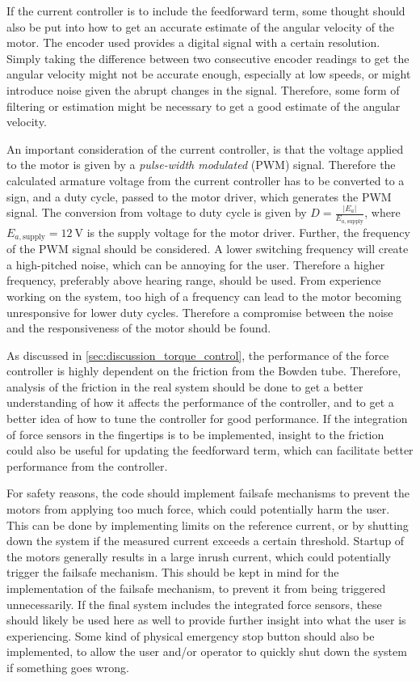 If the current controller is to include the feedforward term, some thought should also be put into how to get an accurate estimate of the angular velocity of the motor. The encoder used provides a digital signal with a certain resolution. Simply taking the difference between two consecutive encoder readings to get the angular velocity might not be accurate enough, especially at low speeds, or might introduce noise given the abrupt changes in the signal. Therefore, some form of filtering or estimation might be necessary to get a good estimate of the angular velocity.

An important consideration of the current controller, is that the voltage applied to the motor is given by a \textit{pulse-width modulated} (PWM) signal. Therefore the calculated armature voltage from the current controller has to be converted to a sign, and a duty cycle, passed to the motor driver, which generates the PWM signal. The conversion from voltage to duty cycle is given by $D = \frac{|E_a|}{E_{a, \text{supply}}}$, where $E_{a, \text{supply}}= \SI{12}{\volt}$ is the supply voltage for the motor driver. Further, the frequency of the PWM signal should be considered. A lower switching frequency will create a high-pitched noise, which can be annoying for the user. Therefore a higher frequency, preferably above hearing range, should be used. From experience working on the system, too high of a frequency can lead to the motor becoming unresponsive for lower duty cycles. Therefore a compromise between the noise and the responsiveness of the motor should be found.

As discussed in \cref{sec:discussion_torque_control}, the performance of the force controller is highly dependent on the friction from the Bowden tube. Therefore, analysis of the friction in the real system should be done to get a better understanding of how it affects the performance of the controller, and to get a better idea of how to tune the controller for good performance. If the integration of force sensors in the fingertips is to be implemented, insight to the friction could also be useful for updating the feedforward term, which can facilitate better performance from the controller.

For safety reasons, the code should implement failsafe mechanisms to prevent the motors from applying too much force, which could potentially harm the user. This can be done by implementing limits on the reference current, or by shutting down the system if the measured current exceeds a certain threshold. Startup of the motors generally results in a large inrush current, which could potentially trigger the failsafe mechanism. This should be kept in mind for the implementation of the failsafe mechanism, to prevent it from being triggered unnecessarily. If the final system includes the integrated force sensors, these should likely be used here as well to provide further insight into what the user is experiencing. Some kind of physical emergency stop button should also be implemented, to allow the user and/or operator to quickly shut down the system if something goes wrong.

